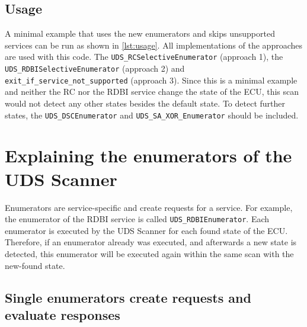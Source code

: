 \subsection{Usage}

A minimal example that uses the new enumerators and skips unsupported services can be run as shown in \autoref{lst:usage}. All implementations of the approaches are used with this code. The \texttt{UDS_RCSelectiveEnumerator} (approach 1), the \texttt{UDS_RDBISelectiveEnumerator} (approach 2) and \texttt{exit_if_service_not_supported} (approach 3). Since this is a minimal example and neither the RC nor the RDBI service change the state of the ECU, this scan would not detect any other states besides the default state. To detect further states, the \texttt{UDS_DSCEnumerator} and \texttt{UDS_SA_XOR_Enumerator} should be included.




\newpage

\section{Explaining the enumerators of the UDS Scanner}
\label{sec:enumerators}

Enumerators are service-specific and create requests for a service. For example, the enumerator of the RDBI service is called \texttt{UDS_RDBIEnumerator}. Each enumerator is executed by the UDS Scanner for each found state of the ECU. Therefore, if an enumerator already was executed, and afterwards a new state is detected, this enumerator will be executed again within the same scan with the new-found state.

\subsection{Single enumerators create requests and evaluate responses}

